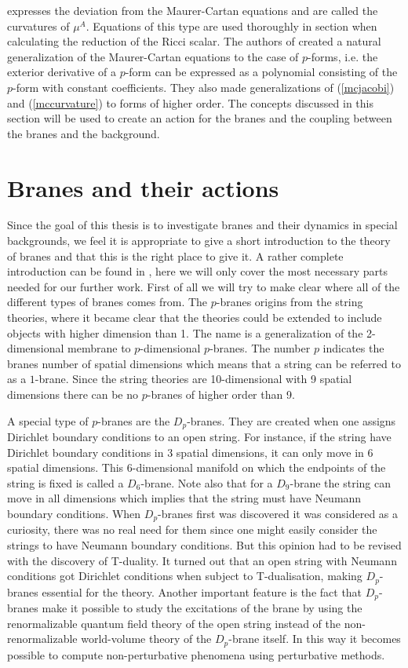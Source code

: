 expresses the deviation from the Maurer-Cartan equations and are called the curvatures of $\mu^A$. Equations of this type are used thoroughly 
in section  when calculating the reduction of the Ricci scalar. The authors of \cite{maurer} created a natural generalization of 
the Maurer-Cartan equations to the case of $p$-forms, i.e. the exterior derivative of a $p$-form can be expressed as a polynomial consisting of the $p$-form with constant coefficients. 
They also made generalizations of (\ref{mcjacobi}) and (\ref{mccurvature}) to forms of higher order. The concepts discussed in this section will be used to create an action for the branes and the coupling between the branes and the background.

\section{Branes and their actions}
\label{sec:branes}
Since the goal of this thesis is to investigate branes and their dynamics in special backgrounds, we feel it is appropriate 
to give a short introduction to the theory of branes and that this is the right place to give it. A rather complete introduction can be found 
in \cite{bengtsson}, here we will only cover the most necessary parts needed for our further work. First of all we will try to 
make clear where all of the different types of branes comes from. The $p$-branes origins from the string theories, where it became 
clear that the theories could be extended to include objects with higher dimension than 1. The name is a generalization of the 
2-dimensional membrane to $p$-dimensional $p$-branes. The number $p$ indicates the branes number of spatial dimensions which means that a string can be referred to as a $1$-brane. Since the string theories 
are 10-dimensional with 9 spatial dimensions there can be no $p$-branes of higher order than 9.

A special type of $p$-branes are the $D_p$-branes. They are created when one assigns Dirichlet boundary conditions to an open string. 
For instance, if the string have Dirichlet boundary conditions in 3 spatial dimensions, it can only move in 6 spatial dimensions. 
This 6-dimensional manifold on which the endpoints of the string is fixed is called a $D_6$-brane. Note also that for a 
$D_9$-brane the string can move in all dimensions which implies that the string must have Neumann boundary conditions. When $D_p$-branes 
first was discovered it was considered as a curiosity, there was no real need for them since one might easily consider the strings to have Neumann boundary conditions. 
But this opinion had to be revised with the discovery of T-duality. It turned out that an open string with Neumann conditions got 
Dirichlet conditions when subject to T-dualisation, making $D_p$-branes essential for the theory. Another important feature is the fact 
that $D_p$-branes make it possible to study the excitations of the brane by using the renormalizable quantum field theory of the open string 
instead of the non-renormalizable world-volume theory of the $D_p$-brane itself. In this way it becomes possible to compute non-perturbative phenomena using perturbative methods. 

